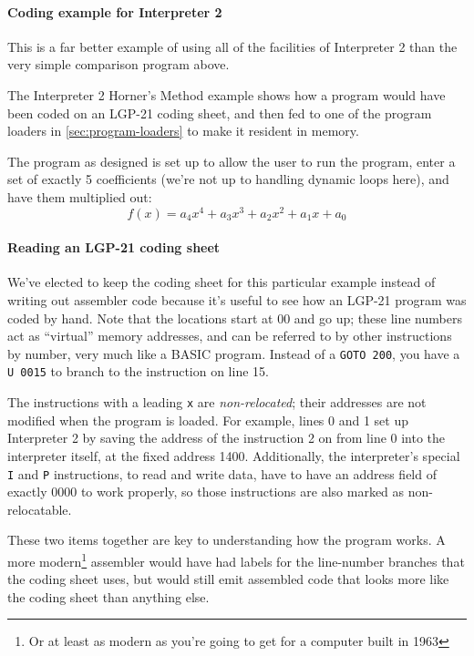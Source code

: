 \paragraph{Coding example for Interpreter 2}
This is a far better example of using all of the facilities of Interpreter 2 than the very simple comparison program above.

The Interpreter 2 Horner's Method example shows how a program would have been coded on an LGP-21 coding sheet, and then fed to one of the program loaders in \ref{sec:program-loaders} to make it resident in memory.

The program as designed is set up to allow the user to run the program, enter a set of exactly 5 coefficients (we're not up to handling dynamic loops here), and have them multiplied out:
$$f(x) = a_4x^4 + a_3x^3 + a_2x^2 + a_1x + a_0$$
\paragraph{Reading an LGP-21 coding sheet}
We've elected to keep the coding sheet for this particular example instead of writing out assembler code because it's useful to see how an LGP-21 program was coded by hand.
Note that the locations start at 00 and go up; these line numbers act as ``virtual'' memory addresses, and can be referred to by other instructions by number, very much like a BASIC program. Instead of a \texttt{GOTO 200}, you have a \texttt{U 0015} to branch to the instruction on line 15.

The instructions with a leading \texttt{x} are \emph{non-relocated}; their addresses are not modified when the program is loaded. For example, lines 0 and 1 set up Interpreter 2 by saving the address of the instruction 2 on from line 0 into the interpreter itself, at the fixed address 1400. Additionally, the interpreter's special \texttt{I} and \texttt{P} instructions, to read and write data, have to have an address field of exactly 0000 to work properly, so those instructions are also marked as non-relocatable.

These two items together are key to understanding how the program works. A more modern\footnote{Or at least as modern as you're going to get for a computer built in 1963} assembler would have had labels for the line-number branches that the coding sheet uses, but would still emit assembled code that looks more like the coding sheet than anything else.

